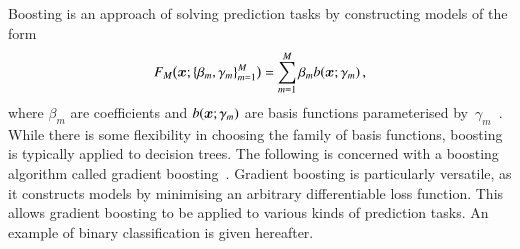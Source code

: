 Boosting is an approach of solving prediction tasks by constructing models of
the form
\begin{align*}
  F_{M}\bigl(\bm{x}; \{ \beta_m, \gamma_{m} \}_{m=1}^{M} \bigr) = \sum_{m = 1}^{M} \beta_m b(\bm{x}; \gamma_{m}) \,\text{,}
\end{align*}
where $\beta_m$ are coefficients and $b(\bm{x}; \gamma_{m})$ are basis
functions parameterised
by~$\gamma_{m}$~\cite{Friedman:2000,Friedman:2001wbq}. While there is some
flexibility in choosing the family of basis functions, boosting is typically
applied to decision trees.
The following is concerned with a boosting algorithm called gradient
boosting~\cite{Friedman:2001wbq}. Gradient boosting is particularly versatile,
as it constructs models by minimising an arbitrary differentiable loss function.
This allows gradient boosting to be applied to various kinds of prediction
tasks. An example of binary classification is given hereafter.


